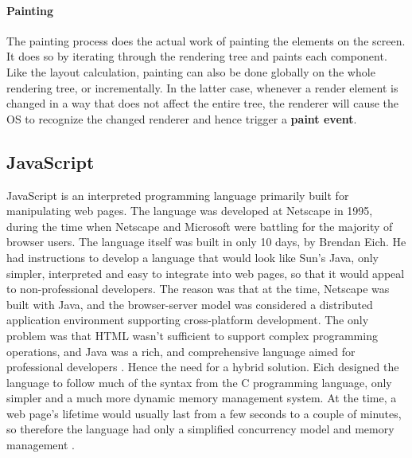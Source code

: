 \paragraph{Painting}
The painting process does the actual work of painting the elements on the screen. It does so by iterating through the rendering tree and paints each component. Like the layout calculation, painting can also be done globally on the whole rendering tree, or incrementally. In the latter case, whenever a render element is changed in a way that does not affect the entire tree, the renderer will cause the OS to recognize the changed renderer and hence trigger a \textbf{paint event}.
 
\subsection{JavaScript}
JavaScript is an interpreted programming language primarily built for manipulating web pages. The language was developed at Netscape in 1995, during the time when Netscape and Microsoft were battling for the majority of browser users. The language itself was built in only 10 days, by Brendan Eich.\cite{jsin10days} He had instructions to develop a language that would look like Sun's Java, only simpler, interpreted and easy to integrate into web pages, so that it would appeal to non-professional developers. The reason was that at the time, Netscape was built with Java, and the browser-server model was considered a distributed application environment supporting cross-platform development. The only problem was that HTML wasn't sufficient to support complex programming operations, and Java was a rich, and comprehensive language aimed for professional developers \cite{jsin10days}. Hence the need for a hybrid solution. Eich designed the language to follow much of the syntax from the C programming language, only simpler and a much more dynamic memory management system. At the time, a web page's lifetime would usually last from a few seconds to a couple of minutes, so therefore the language had only a simplified concurrency model and memory management \cite{jsin10days}.

